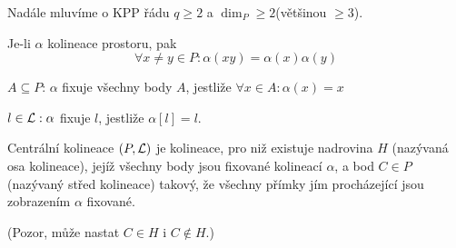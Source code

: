 \begin{agreement}
	Nadále mluvíme o KPP řádu $q \geq 2$ a $\dim_P \geq 2$(většinou $\geq 3$).
\end{agreement}

\begin{note}
    Je-li $\alpha$ kolineace prostoru, pak
    \[ \forall x\neq y\in P: \alpha(xy)=\alpha(x)\alpha(y) \]
\end{note}

\begin{definition}[Fixace]
    $A\subseteq P$: $\alpha$ fixuje všechny body $A$, jestliže $\forall x\in A: \alpha(x)=x$

    $l\in\operatorname{\mathcal{L}}: \alpha$ fixuje $l$, jestliže $\alpha[l]=l$.
\end{definition}

\begin{definition}\label{kpp:centr_kolin}
    Centrální kolineace $(P,\operatorname{\mathcal{L}})$ je kolineace, pro niž existuje nadrovina $H$ (nazývaná osa kolineace), jejíž všechny body jsou fixované kolineací $\alpha$, a bod $C\in P$ (nazývaný střed kolineace) takový, že všechny přímky jím procházející jsou zobrazením $\alpha$ fixované.

    (Pozor, může nastat $C\in H$ i $C\not\in H$.)
\end{definition}

